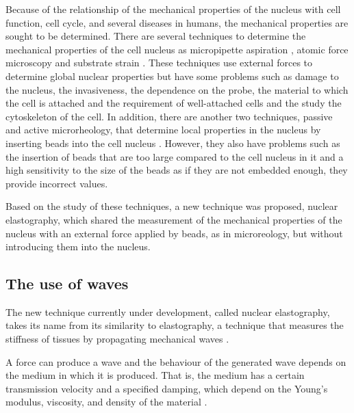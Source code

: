 \documentclass[12pt, a4paper]{article} %
\begin{document}
	Because of the relationship of the mechanical properties of the nucleus with cell function, cell cycle, and several diseases in humans, the mechanical properties are sought to be determined. There are several techniques to determine the mechanical properties of the cell nucleus as micropipette aspiration \cite{gonzalez2019advances}, atomic force microscopy \cite{janel2019stiffness} and substrate strain \cite{murphy2011automated}. These techniques use external forces to determine global nuclear properties but have some problems such as damage to the nucleus, the invasiveness, the dependence on the probe, the material to which the cell is attached and the requirement of well-attached cells and the study the cytoskeleton of the cell. In addition, there are another two techniques, passive and active microrheology, that determine local properties in the nucleus by inserting beads into the cell nucleus \cite{lammerding2011mechanics, lammerding2007nuclear, de2007direct}. However, they also have problems such as the insertion of beads that are too large compared to the cell nucleus in it and a high sensitivity to the size of the beads as if they are not embedded enough, they provide incorrect values.
	
	Based on the study of these techniques, a new technique was proposed, nuclear elastography, which shared the measurement of the mechanical properties of the nucleus with an external force applied by beads, as in microreology, but without introducing them into the nucleus. 
	
	\setlength{\parskip}{0mm}
	
	\subsection{The use of waves}
	
	The new technique currently under development, called nuclear elastography, takes its name from its similarity to elastography, a technique that measures the stiffness of tissues by propagating mechanical waves \cite{gennisson2013ultrasound}. 
	
	\setlength{\parskip}{4mm}
	
	A force can produce a wave and the behaviour of the generated wave depends on the medium in which it is produced. That is, the medium has a certain transmission velocity and a specified damping, which depend on the Young's modulus, viscosity, and density of the material \cite{achenbach2012wave}. 
	
\end{document}
